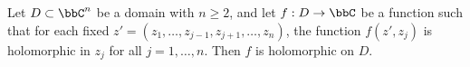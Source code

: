     \begin{theorem}\label{thm:Hartogs'_Separate_Analyticity_Theorem}
        Let \(D \subset \bbC^n\) be a domain with \(n \geq 2\), and let \(f: D \to \bbC\) be a function such that for each fixed \(z' = (z_1, \ldots, z_{j-1}, z_{j+1}, \ldots, z_n)\), the function \(f(z', z_j)\) is holomorphic in \(z_j\) for all \(j = 1, \ldots, n\). Then \(f\) is holomorphic on \(D\).
    \end{theorem}